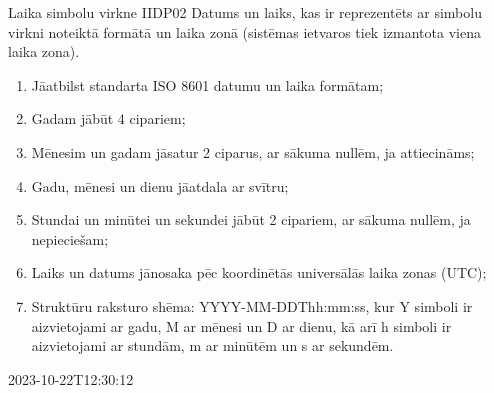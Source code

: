 {Laika simbolu virkne}
{IIDP02}
{
	Datums un laiks, kas ir reprezentēts ar simbolu virkni noteiktā formātā un laika zonā (sistēmas ietvaros tiek izmantota viena laika zona).
}
{
	\begin{enumerate}
		\item Jāatbilst standarta ISO 8601 datumu un laika formātam;
		\item Gadam jābūt 4 cipariem;
		\item Mēnesim un gadam jāsatur 2 ciparus, ar sākuma nullēm, ja attiecināms;
		\item Gadu, mēnesi un dienu jāatdala ar svītru;
		\item Stundai un minūtei un sekundei jābūt 2 cipariem, ar sākuma nullēm, ja nepieciešam;
		\item Laiks un datums jānosaka pēc koordinētās universālās laika zonas (UTC);
		\item Struktūru raksturo shēma: YYYY-MM-DDThh:mm:ss, kur Y simboli ir aizvietojami ar gadu, M ar mēnesi un D ar dienu, kā arī h simboli ir aizvietojami ar stundām, m ar minūtēm un s ar sekundēm.
	\end{enumerate}
}
{
	2023-10-22T12:30:12
}
